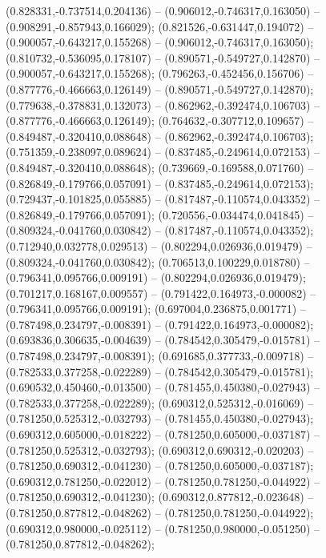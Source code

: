  (0.828331,-0.737514,0.204136) -- (0.906012,-0.746317,0.163050) -- (0.908291,-0.857943,0.166029);
 (0.821526,-0.631447,0.194072) -- (0.900057,-0.643217,0.155268) -- (0.906012,-0.746317,0.163050);
 (0.810732,-0.536095,0.178107) -- (0.890571,-0.549727,0.142870) -- (0.900057,-0.643217,0.155268);
 (0.796263,-0.452456,0.156706) -- (0.877776,-0.466663,0.126149) -- (0.890571,-0.549727,0.142870);
 (0.779638,-0.378831,0.132073) -- (0.862962,-0.392474,0.106703) -- (0.877776,-0.466663,0.126149);
 (0.764632,-0.307712,0.109657) -- (0.849487,-0.320410,0.088648) -- (0.862962,-0.392474,0.106703);
 (0.751359,-0.238097,0.089624) -- (0.837485,-0.249614,0.072153) -- (0.849487,-0.320410,0.088648);
 (0.739669,-0.169588,0.071760) -- (0.826849,-0.179766,0.057091) -- (0.837485,-0.249614,0.072153);
 (0.729437,-0.101825,0.055885) -- (0.817487,-0.110574,0.043352) -- (0.826849,-0.179766,0.057091);
 (0.720556,-0.034474,0.041845) -- (0.809324,-0.041760,0.030842) -- (0.817487,-0.110574,0.043352);
 (0.712940,0.032778,0.029513) -- (0.802294,0.026936,0.019479) -- (0.809324,-0.041760,0.030842);
 (0.706513,0.100229,0.018780) -- (0.796341,0.095766,0.009191) -- (0.802294,0.026936,0.019479);
 (0.701217,0.168167,0.009557) -- (0.791422,0.164973,-0.000082) -- (0.796341,0.095766,0.009191);
 (0.697004,0.236875,0.001771) -- (0.787498,0.234797,-0.008391) -- (0.791422,0.164973,-0.000082);
 (0.693836,0.306635,-0.004639) -- (0.784542,0.305479,-0.015781) -- (0.787498,0.234797,-0.008391);
 (0.691685,0.377733,-0.009718) -- (0.782533,0.377258,-0.022289) -- (0.784542,0.305479,-0.015781);
 (0.690532,0.450460,-0.013500) -- (0.781455,0.450380,-0.027943) -- (0.782533,0.377258,-0.022289);
 (0.690312,0.525312,-0.016069) -- (0.781250,0.525312,-0.032793) -- (0.781455,0.450380,-0.027943);
 (0.690312,0.605000,-0.018222) -- (0.781250,0.605000,-0.037187) -- (0.781250,0.525312,-0.032793);
 (0.690312,0.690312,-0.020203) -- (0.781250,0.690312,-0.041230) -- (0.781250,0.605000,-0.037187);
 (0.690312,0.781250,-0.022012) -- (0.781250,0.781250,-0.044922) -- (0.781250,0.690312,-0.041230);
 (0.690312,0.877812,-0.023648) -- (0.781250,0.877812,-0.048262) -- (0.781250,0.781250,-0.044922);
 (0.690312,0.980000,-0.025112) -- (0.781250,0.980000,-0.051250) -- (0.781250,0.877812,-0.048262);
